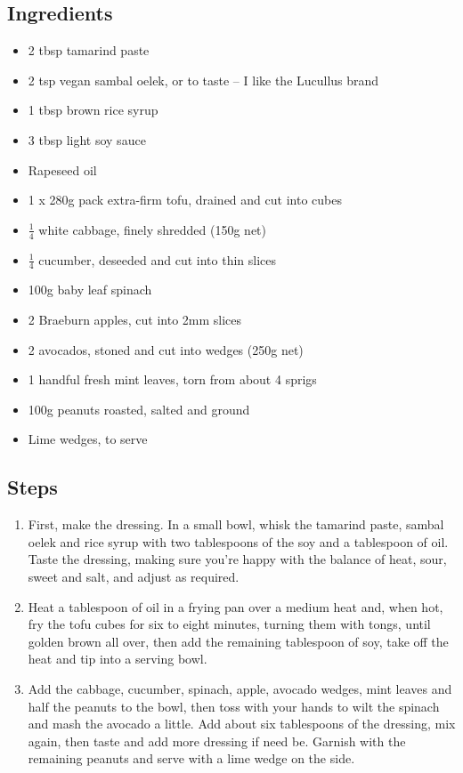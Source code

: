 \documentclass{book}
\begin{document}
\subsection*{Ingredients}
\begin{itemize}
\item 2 tbsp tamarind paste
\item 2 tsp vegan sambal oelek, or to taste – I like the Lucullus brand
\item 1 tbsp brown rice syrup
\item 3 tbsp light soy sauce
\item Rapeseed oil
\item 1 x 280g pack extra-firm tofu, drained and cut into cubes
\item $\frac{1}{4}$ white cabbage, finely shredded (150g net) 
\item $\frac{1}{4}$ cucumber, deseeded and cut into thin slices
\item 100g baby leaf spinach 
\item 2 Braeburn apples, cut into 2mm slices 
\item 2 avocados, stoned and cut into wedges (250g net)
\item 1 handful fresh mint leaves, torn from about 4 sprigs
\item 100g peanuts roasted, salted and ground
\item Lime wedges, to serve
\end{itemize}

\subsection*{Steps}
\begin{enumerate}
\item First, make the dressing. In a small bowl, whisk the tamarind paste, sambal oelek and rice syrup with two tablespoons of the soy and a tablespoon of oil. Taste the dressing, making sure you’re happy with the balance of heat, sour, sweet and salt, and adjust as required.
\item Heat a tablespoon of oil in a frying pan over a medium heat and, when hot, fry the tofu cubes for six to eight minutes, turning them with tongs, until golden brown all over, then add the remaining tablespoon of soy, take off the heat and tip into a serving bowl.
\item Add the cabbage, cucumber, spinach, apple, avocado wedges, mint leaves and half the peanuts to the bowl, then toss with your hands to wilt the spinach and mash the avocado a little. Add about six tablespoons of the dressing, mix again, then taste and add more dressing if need be. Garnish with the remaining peanuts and serve with a lime wedge on the side.
\end{enumerate}
\newpage
\end{document}
